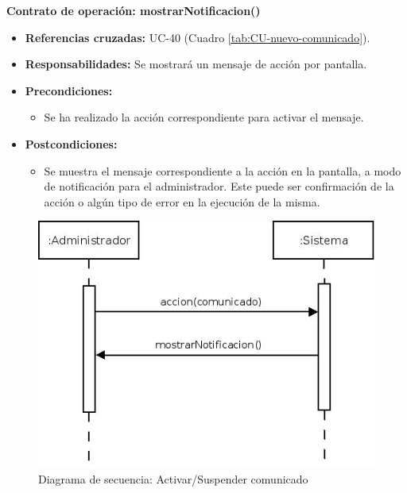 \textbf{Contrato de operación: mostrarNotificacion()}
\begin{itemize}
\item \textbf{Referencias cruzadas:} UC-40 (Cuadro \ref{tab:CU-nuevo-comunicado}).
\item \textbf{Responsabilidades:} Se mostrará un mensaje de acción por pantalla.
\item \textbf{Precondiciones:} 
 \begin{itemize}
\item Se ha realizado la acción correspondiente para activar el mensaje.
\end {itemize}
\item \textbf{Postcondiciones:} 
 \begin{itemize}
\item Se muestra el mensaje correspondiente a la acción en la pantalla, a modo de notificación para el administrador. Este puede ser confirmación de la acción o algún tipo de error en la ejecución de la misma.
\end {itemize}
\end {itemize}


\vspace{10mm}

\begin{figure}[H]
\centering
  \includegraphics[scale=.55]{img/secuencias/suspender-activar-comunicado.jpeg}
  \caption{Diagrama de secuencia: Activar/Suspender comunicado}
  \label{fig:secuencia-suspender-activar-comunicado}
\end{figure}


